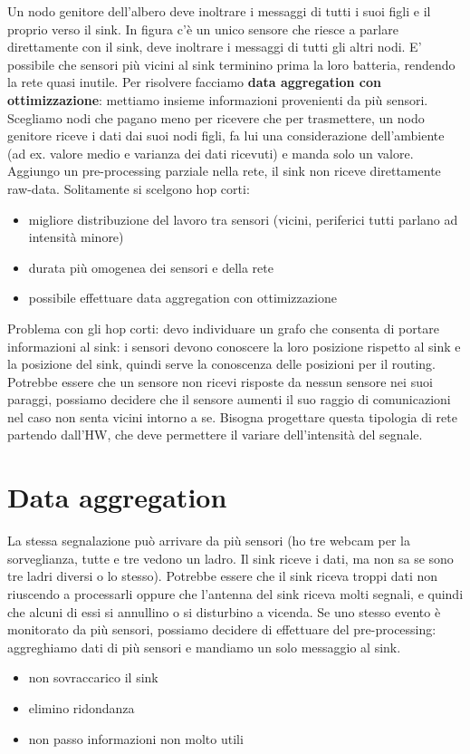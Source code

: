 \documentclass[12pt,italian]{report}
\begin{document}
\bigbreak
Un nodo genitore dell'albero deve inoltrare i messaggi di tutti i suoi figli e il proprio verso il sink. In figura c'è un unico sensore che riesce a parlare direttamente con il sink, deve inoltrare i messaggi di tutti gli altri nodi. E' possibile che sensori più vicini al sink terminino prima la loro batteria, rendendo la rete quasi inutile. Per risolvere facciamo \textbf{data aggregation con ottimizzazione}: mettiamo insieme informazioni provenienti da più sensori. Scegliamo nodi che pagano meno per ricevere che per trasmettere, un nodo genitore riceve i dati dai suoi nodi figli, fa lui una considerazione dell'ambiente (ad ex. valore medio e varianza dei dati ricevuti) e manda solo un valore. Aggiungo un pre-processing parziale nella rete, il sink non riceve direttamente raw-data. 
\bigbreak
\noindent Solitamente si scelgono hop corti:
\begin{itemize}
    \item migliore distribuzione del lavoro tra sensori (vicini, periferici tutti parlano ad intensità minore)
    \item durata più omogenea dei sensori e della rete
    \item possibile effettuare data aggregation con ottimizzazione
\end{itemize}
Problema con gli hop corti: devo individuare un grafo che consenta di portare informazioni al sink: i sensori devono conoscere la loro posizione rispetto al sink e la posizione del sink, quindi serve la conoscenza delle posizioni per il routing. 
\bigbreak 
Potrebbe essere che un sensore non ricevi risposte da nessun sensore nei suoi paraggi, possiamo decidere che il sensore aumenti il suo raggio di comunicazioni nel caso non senta vicini intorno a se. Bisogna progettare questa tipologia di rete partendo dall'HW, che deve permettere il variare dell'intensità del segnale. 

\section{Data aggregation}
\label{sec:dagg}

La stessa segnalazione può arrivare da più sensori (ho tre webcam per la sorveglianza, tutte e tre vedono un ladro. Il sink riceve i dati, ma non sa se sono tre ladri diversi o lo stesso). Potrebbe essere che il sink riceva troppi dati non riuscendo a processarli oppure che l'antenna del sink riceva molti segnali, e quindi che alcuni di essi si annullino o si disturbino a vicenda. 
\bigbreak
Se uno stesso evento è monitorato da più sensori, possiamo decidere di effettuare del pre-processing: aggreghiamo dati di più sensori e mandiamo un solo messaggio al sink. 
\begin{itemize}
    \item non sovraccarico il sink
    \item elimino ridondanza
    \item non passo informazioni non molto utili
\end{itemize}
\end{document}
